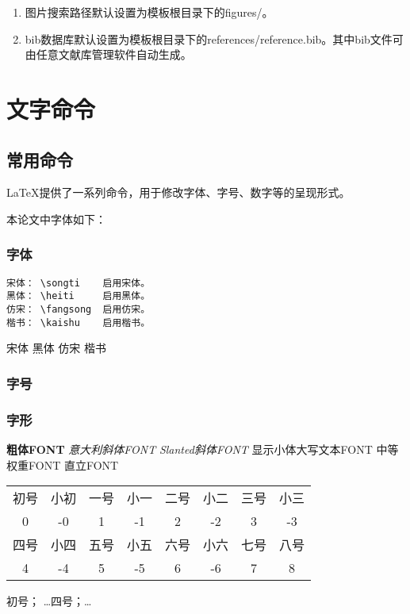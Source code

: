 \begin{enumerate}[label=(\arabic*)]
    \item 图片搜索路径默认设置为模板根目录下的figures/。
    \item bib数据库默认设置为模板根目录下的references/reference.bib。其中bib文件可由任意文献库管理软件自动生成。
\end{enumerate}

\section{文字命令}
\subsection{常用命令}
\LaTeX 提供了一系列命令，用于修改字体、字号、数字等的呈现形式。

本论文中字体如下：
\subsubsection{字体}
\begin{verbatim}
宋体： \songti    启用宋体。
黑体： \heiti     启用黑体。
仿宋： \fangsong  启用仿宋。
楷书： \kaishu    启用楷书。
\end{verbatim}
{\songti 宋体} {\heiti 黑体}    {\fangsong 仿宋}     {\kaishu 楷书}
\subsubsection{字号}%

\subsubsection{字形}
\textbf{粗体FONT} 
\textit{意大利斜体FONT}
\textsl{Slanted斜体FONT}
\textsc{显示小体大写文本FONT}
\textmd{中等权重FONT}
\textup{直立FONT}

\begin{center}
	\begin{tabular}{cccccccc}
		\toprule
		初号 & 小初 & 一号 & 小一 & 二号 & 小二 & 三号 & 小三 \\
		0 & -0 & 1 & -1 & 2 & -2 & 3 & -3 \\
		\hline
		四号 & 小四 & 五号 & 小五 & 六号 & 小六 & 七号 & 八号 \\
		4 & -4 & 5 & -5 & 6 & -6 & 7 & 8 \\
		\bottomrule
	\end{tabular}
\end{center}
{初号}； \dots {四号}；\dots {}